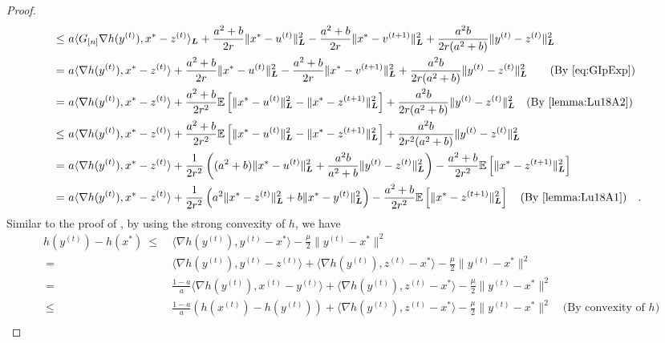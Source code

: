 \begin{proof}
\begin{align}
    \leq~& a \langle G_{[n]} \nabla h( y^{(t)} ), x^* - z^{(t)} \rangle_{\bL} + \frac{a^2+b}{2r} \| x^* - u^{(t)} \|_{\bL}^2 - \frac{a^2+b}{2r} \| x^* - v^{(t+1)} \|_{\bL}^2 + \frac{a^2b}{2r(a^2+b)} \| y^{(t)} - z^{(t)} \|_{\bL}^2 \nonumber \\
    =~& a \langle \nabla h( y^{(t)} ), x^* - z^{(t)} \rangle + \frac{a^2+b}{2r} \| x^* - u^{(t)} \|_{\bL}^2 - \frac{a^2+b}{2r} \| x^* - v^{(t+1)} \|_{\bL}^2 + \frac{a^2b}{2r(a^2+b)} \| y^{(t)} - z^{(t)} \|_{\bL}^2 \quad \text{(By \autoref{eq:GIpExp})} \nonumber \\
    {=}~& a \langle \nabla h( y^{(t)} ), x^* - z^{(t)} \rangle + \frac{a^2+b}{2r^2} \mE \left[ \| x^* - u^{(t)} \|_{\bL}^2 - \| x^* - z^{(t+1)} \|_{\bL}^2 \right] + \frac{a^2b}{2r(a^2+b)} \| y^{(t)} - z^{(t)} \|_{\bL}^2 \text{(By \autoref{lemma:Lu18A2})} \nonumber \\
    \leq~& a \langle \nabla h( y^{(t)} ), x^* - z^{(t)} \rangle + \frac{a^2+b}{2r^2} \mE \left[ \| x^* - u^{(t)} \|_{\bL}^2 - \| x^* - z^{(t+1)} \|_{\bL}^2 \right] + \frac{a^2b}{2r^2(a^2+b)} \| y^{(t)} - z^{(t)} \|_{\bL}^2 \nonumber \\
    =~& a \langle \nabla h( y^{(t)} ), x^* - z^{(t)} \rangle + \frac{1}{2r^2} \left( (a^2 +b ) \| x^* - u^{(t)} \|_{\bL}^2 + \frac{a^2b}{a^2+b}  \| y^{(t)} - z^{(t)} \|_{\bL}^2 \right) - \frac{a^2 + b}{2r^2} \mE \left[  \| x^* - z^{(t+1)} \|_{\bL}^2 \right] \nonumber \\
    =~& a \langle \nabla h( y^{(t)} ), x^* - z^{(t)} \rangle + \frac{1}{2r^2} \left( a^2 \| x^* - z^{(t)} \|_{\bL}^2 + b \| x^* - y^{(t)} \|_{\bL}^2 \right) - \frac{a^2 + b}{2r^2} \mE \left[  \| x^* - z^{(t+1)} \|_{\bL}^2 \right] \text{(By \autoref{lemma:Lu18A1})}. \label{eq:accRBCDStronglyCVX1}
\end{align}
Similar to the proof of \citet[Theorem~3.1]{Lu18}, by using the strong convexity of $h$, we have
\begin{align*}
    h( y^{(t)} ) - h(x^*) ~\leq~& \langle \nabla h( y^{(t)} ), y^{(t)} - x^*  \rangle - \frac{\mu}{2} \| y^{(t)} - x^* \|^2 \\
    ~=~& \langle \nabla h( y^{(t)} ), y^{(t)} - z^{(t)} \rangle + \langle \nabla h( y^{(t)} ), z^{(t)} - x^* \rangle - \frac{\mu}{2} \| y^{(t)} - x^* \|^2 \\
    ~=~&  \frac{1-a}{a}\langle \nabla h( y^{(t)} ), x^{(t)} - y^{(t)} \rangle + \langle \nabla h( y^{(t)} ), z^{(t)} - x^* \rangle - \frac{\mu}{2} \| y^{(t)} - x^* \|^2 \\
    ~\leq~ & \frac{1-a}{a}( h( x^{(t)} ) - h(y^{(t)}) ) + \langle \nabla h( y^{(t)} ), z^{(t)} - x^* \rangle - \frac{\mu}{2} \| y^{(t)} - x^* \|^2 \quad \text{(By convexity of $h$)} \\

\end{align*}
\end{proof}
